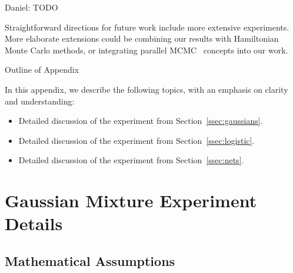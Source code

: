 \documentclass{article}
\begin{document}
{\color{blue}
Daniel: TODO
}

Straightforward directions for future work include more extensive experiments. More elaborate
extensions could be combining our results with Hamiltonian Monte Carlo methods, or integrating
parallel MCMC~\cite{conf/uai/AngelinoKWSA14} concepts into our work.


\small


\normalsize

\clearpage
\appendix

\begin{center}
{\Large Outline of Appendix}
\end{center}

In this appendix, we describe the following topics, with an emphasis on clarity and understanding:

\begin{itemize}[noitemsep]
    \item Detailed discussion of the experiment from Section~\ref{ssec:gaussians}.
    \item Detailed discussion of the experiment from Section~\ref{ssec:logistic}.
    \item Detailed discussion of the experiment from Section~\ref{ssec:nets}.
\end{itemize}

\section{Gaussian Mixture Experiment Details}

\subsection{Mathematical Assumptions}
\end{document}
